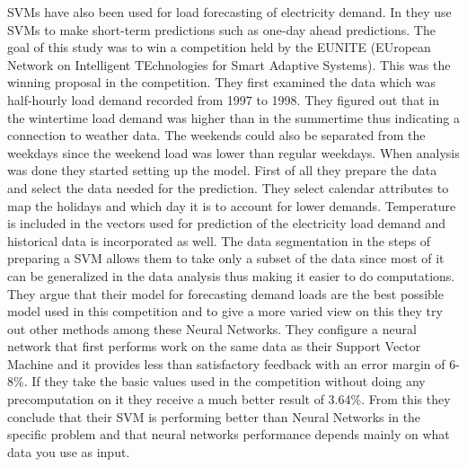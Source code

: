 SVMs have also been used for load forecasting of electricity demand. In \cite{chen2004load} they use SVMs to make short-term predictions such as one-day ahead predictions. The goal of this study was to win a competition held by the EUNITE (EUropean Network on Intelligent TEchnologies for Smart Adaptive Systems). This was the winning proposal in the competition. They first examined the data which was half-hourly load demand recorded from 1997 to 1998. They figured out that in the wintertime load demand was higher than in the summertime thus indicating a connection to weather data. The weekends could also be separated from the weekdays since the weekend load was lower than regular weekdays. When analysis was done they started setting up the model. First of all they prepare the data and select the data needed for the prediction. They select calendar attributes to map the holidays and which day it is to account for lower demands. Temperature is included in the vectors used for prediction of the electricity load demand and historical data is incorporated as well. The data segmentation in the steps of preparing a SVM allows them to take only a subset of the data since most of it can be generalized in the data analysis thus making it easier to do computations. They argue that their model for forecasting demand loads are the best possible model used in this competition and to give a more varied view on this they try out other methods among these Neural Networks. They configure a neural network that first performs work on the same data as their Support Vector Machine and it provides less than satisfactory feedback with an error margin of 6-8\%. If they take the basic values used in the competition without doing any precomputation on it they receive a much better result of 3.64\%. From this they conclude that their SVM is performing better than Neural Networks in the specific problem and that neural networks performance depends mainly on what data you use as input. 